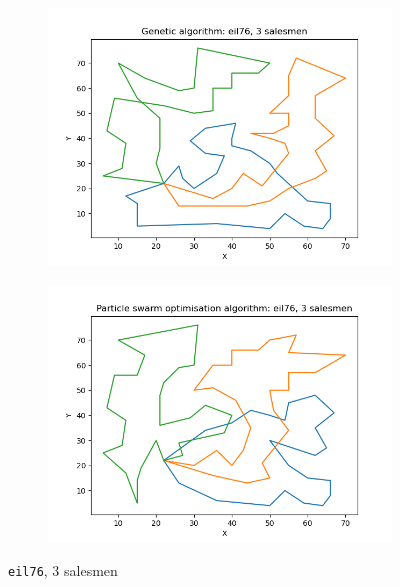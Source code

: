 \documentclass[conference]{IEEEtran}
\begin{document}
\begin{figure}[h]
    \centering
    \begin{subfigure}{.5\textwidth}
      \centering
      \includegraphics[width=\textwidth]{images/Genetic algorithm: eil76, 3 salesmen.png}
    \end{subfigure}%
    \begin{subfigure}{.5\textwidth}
      \centering
      \includegraphics[width=\textwidth]{images/Particle swarm optimisation algorithm: eil76, 3 salesmen.png}
    \end{subfigure}%
    \caption{\texttt{eil76}, 3 salesmen} \label{eil76, 3 salesmen}
\end{figure}
\end{document}

